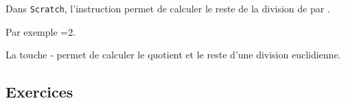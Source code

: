 \documentclass[main.tex]{subfiles}
\begin{document}
\begin{marginfigure}
	\begin{scratch}[scale=0.8, num blocks=true]
		{ 
		} 
	\end{scratch}
	\caption{Un script pour tester si nbr est divisible par 7} 
\end{marginfigure} 


\begin{remark} Dans \texttt{Scratch}, l'instruction  permet de calculer le reste de la division de  par .
	
	Par exemple =2.
\end{remark} 
\begin{remark} La touche {-} permet de calculer le quotient et le reste d'une division euclidienne.
	\end{remark}

\newpage 
{}  
\pagestyle{scrheadings} %
\onehalfspacing
\subsection{Exercices}
\end{document}
